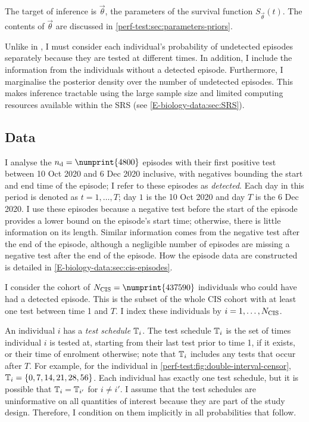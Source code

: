 \documentclass[thesis.tex]{subfiles}
\begin{document}
The target of inference is $\vec{\theta}$, the parameters of the survival function $S_{\vec{\theta}}(t)$.
The contents of $\vec{\theta}$ are discussed in \cref{perf-test:sec:parameters-priors}.

Unlike in \textcite{heiseyModelling}, I must consider each individual's probability of undetected episodes separately because they are tested at different times.
In addition, I include the information from the individuals without a detected episode.
Furthermore, I marginalise the posterior density over the number of undetected episodes.
This makes inference tractable using the large sample size and limited computing resources available within the SRS (see \cref{E-biology-data:sec:SRS}).


\subsection{Data} \label{perf-test:sec:data}

I analyse the $\ndet = \numprint{4800}$ episodes with their first positive test between 10 Oct 2020 and 6 Dec 2020 inclusive, with negatives bounding the start and end time of the episode; I refer to these episodes as \emph{detected}.
Each day in this period is denoted as $t = 1, \dots, T$; \ie day $1$ is the 10 Oct 2020 and day $T$ is the 6 Dec 2020.
I use these episodes because a negative test before the start of the episode provides a lower bound on the episode's start time; otherwise, there is little information on its length.
Similar information comes from the negative test after the end of the episode, although a negligible number of episodes are missing a negative test after the end of the episode.
How the episode data are constructed is detailed in \cref{E-biology-data:sec:cis-episodes}.

I consider the cohort of $\Ncis = \numprint{437590}$ individuals who could have had a detected episode.
This is the subset of the whole CIS cohort with at least one test between time 1 and $T$.
I index these individuals by $i = 1, \dots, N_\text{CIS}$.

An individual $i$ has a \emph{test schedule} $\mathbb{T}_i$.
The test schedule $\mathbb{T}_i$ is the set of times individual $i$ is tested at, starting from their last test prior to time 1, if it exists, or their time of enrolment otherwise; note that $\mathbb{T}_i$ includes any tests that occur after $T$.
For example, for the individual in \cref{perf-test:fig:double-interval-censor}, $\mathbb{T}_i = \{ 0, 7, 14, 21, 28, 56 \}$.
Each individual has exactly one test schedule, but it is possible that $\mathbb{T}_i = \mathbb{T}_{i'}$ for $i \neq i'$.
I assume that the test schedules are uninformative on all quantities of interest because they are part of the study design.
Therefore, I condition on them implicitly in all probabilities that follow.
\end{document}
